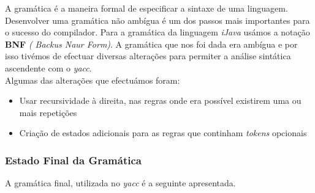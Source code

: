 \documentclass[12pt]{article}
\begin{document}
A gramática é a maneira formal de especificar a sintaxe de uma linguagem. 
Desenvolver uma gramática não ambígua é um dos passos mais importantes para o sucesso do compilador. Para a gramática da linguagem \emph{iJava} usámos a notação \textbf{BNF} \emph{( Backus Naur Form)}. 
A gramática que nos foi dada era ambígua e por isso tivémos de efectuar diversas alterações para permiter a análise sintática ascendente com o \emph{yacc}.\\
Algumas das alterações que efectuámos foram:
\begin{itemize}
	\item Usar recursividade à direita, nas regras onde era possível existirem uma ou mais repetições
	\item Criação de estados adicionais para as regras que continham \emph{tokens} opcionais
\end{itemize}



\subsubsection{Estado Final da Gramática}
A gramática final, utilizada no \emph{yacc} é a seguinte apresentada.
\end{document}
